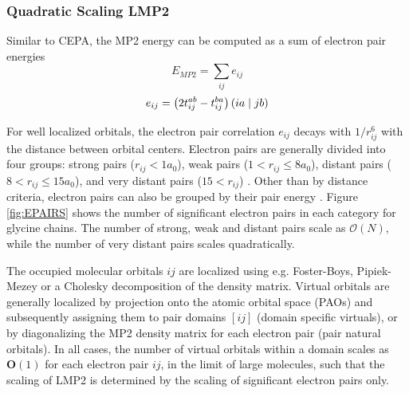 \subsubsection{Quadratic Scaling LMP2}

Similar to CEPA, the MP2 energy can be computed as a sum of electron pair energies
\begin{equation}
E_{MP2} = \sum_{ij} e_{ij}
\end{equation}
\begin{equation}
e_{ij} = \left( 2t_{ij}^{ab} - t_{ij}^{ba} \right) \left( ia \mid jb \right) 
\end{equation} 
 
For well localized orbitals, the electron pair correlation $e_{ij}$ decays with $1/r_{ij}^6$ with the distance between orbital centers. Electron pairs are generally divided into four groups: strong pairs ($r_{ij} < 1a_0$), weak pairs ($1 < r_{ij} \leq 8 a_0$), distant pairs ($8 < r_{ij} \leq 15 a_0$), and very distant pairs ($15 < r_{ij}$) \cite{Sch1999}. Other than by distance criteria, electron pairs can also be grouped by their pair energy \cite{Nee2009}. Figure \ref{fig:EPAIRS} shows the number of significant electron pairs in each category for glycine chains. The number of strong, weak and distant pairs scale as $\mathcal{O}(N)$, while the number of very distant pairs scales quadratically. 

The occupied molecular orbitals $ij$ are localized using e.g. Foster-Boys, Pipiek-Mezey or a Cholesky decomposition of the density matrix. Virtual orbitals are generally localized by projection onto the atomic orbital space (PAOs) and subsequently assigning them to pair domains $[ij]$ (domain specific virtuals), or by diagonalizing the MP2 density matrix for each electron pair (pair natural orbitals).  In all cases, the number of virtual orbitals within a domain scales as $\mathbf{O}(1)$ for each electron pair $ij$, in the limit of large molecules, such that the scaling of LMP2 is determined by the scaling of significant electron pairs only.

